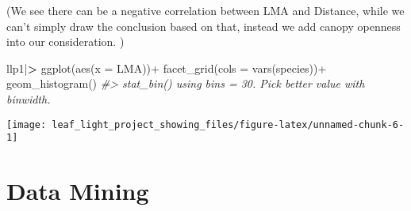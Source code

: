 \documentclass[
]{article}
\newenvironment{Shaded}{\begin{snugshade}}{\end{snugshade}}
\newcommand{\AttributeTok}[1]{\textcolor[rgb]{0.77,0.63,0.00}{#1}}
\newcommand{\CommentTok}[1]{\textcolor[rgb]{0.56,0.35,0.01}{\textit{#1}}}
\newcommand{\ErrorTok}[1]{\textcolor[rgb]{0.64,0.00,0.00}{\textbf{#1}}}
\newcommand{\FunctionTok}[1]{\textcolor[rgb]{0.00,0.00,0.00}{#1}}
\newcommand{\NormalTok}[1]{#1}
\newcommand{\SpecialCharTok}[1]{\textcolor[rgb]{0.00,0.00,0.00}{#1}}
\begin{document}
(We see there can be a negative correlation between LMA and Distance,
while we can't simply draw the conclusion based on that, instead we add
canopy openness into our consideration. )

\begin{Shaded}
\begin{Highlighting}[]
\NormalTok{llp1}\SpecialCharTok{|}\ErrorTok{\textgreater{}} 
  \FunctionTok{ggplot}\NormalTok{(}\FunctionTok{aes}\NormalTok{(}\AttributeTok{x =}\NormalTok{ LMA))}\SpecialCharTok{+}
  \FunctionTok{facet\_grid}\NormalTok{(}\AttributeTok{cols =} \FunctionTok{vars}\NormalTok{(species))}\SpecialCharTok{+}
  \FunctionTok{geom\_histogram}\NormalTok{()}
\CommentTok{\#\textgreater{} \textasciigrave{}stat\_bin()\textasciigrave{} using \textasciigrave{}bins = 30\textasciigrave{}. Pick better value with \textasciigrave{}binwidth\textasciigrave{}.}
\end{Highlighting}
\end{Shaded}

\begin{center}\texttt{[image: leaf\_light\_project\_showing\_files/figure-latex/unnamed-chunk-6-1]} \end{center}

\hypertarget{data-mining}{%
\section{Data Mining}\label{data-mining}}
\end{document}
